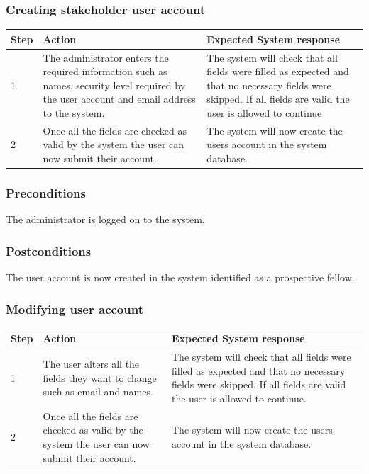 \documentclass[12pt]{article}
\begin{document}
\subsubsection{Creating stakeholder user account}

\begin{center}
\begin{tabular}{|l|p{6cm}|p{8cm}|}
\hline
Step & Action & Expected System response \\
\hline
1 & The administrator enters the required information such as names, security level required by the user account and email address to the system.  & The system will check that all fields were filled as expected and that no necessary fields were skipped. If all fields are valid the user is allowed to continue \\
\hline
2 & Once all the fields are checked as valid by the system the user can now submit their account. & The system will now create the users account in the system database. \\
\hline
\end{tabular}
\end{center}

\subsubsection*{Preconditions}
The administrator is logged on to the system.

\subsubsection*{Postconditions}
The user account is now created in the system identified as a prospective fellow.

\subsubsection{Modifying user account}

\begin{center}
\begin{tabular}{|l|p{6cm}|p{8cm}|}
\hline
Step & Action & Expected System response \\
\hline
1 & The user alters all the fields they want to change such as email and names. & The system will check that all fields were filled as expected and that no necessary fields were skipped. If all fields are valid the user is allowed to continue. \\
\hline
2 & Once all the fields are checked as valid by the system the user can now submit their account. & The system will now create the users account in the system database. \\
\hline
\end{tabular}
\end{center}
\end{document}
